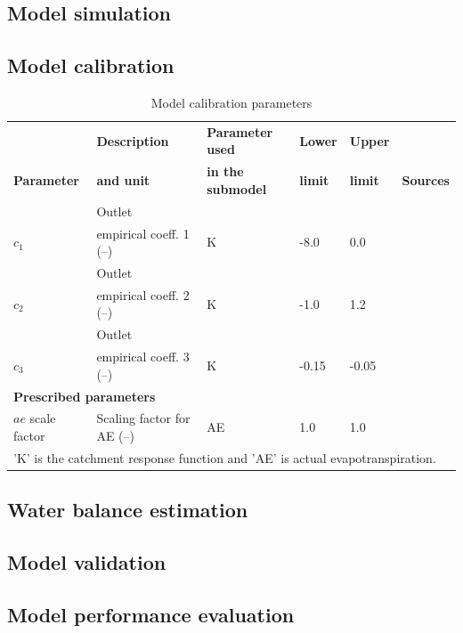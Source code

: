 \subsection{Model simulation}



\subsection{Model calibration}

\begin{table}[ht]
\centering
\caption{Model calibration parameters}
\label{tab:cali_parms}
\begin{tabular}{llllll}
&
  \textbf{Description} &
  \textbf{Parameter used} &
  \textbf{Lower} &
  \textbf{Upper} &
    \\ 
\textbf{Parameter} &
  \textbf{and unit} &
  \textbf{in the submodel} &
  \textbf{limit} &
  \textbf{limit} &
  \textbf{Sources} \\ \toprule
& Outlet & & & &  \\
$c_1$             & empirical coeff. 1 (–) & K  & -8.0  & 0.0   & \autocite{lombranaEvaluationsSnowSimulations2017,sapkotaRegionalModellingNarayani2016} \\
& Outlet & & & &  \\
$c_2$             & empirical coeff. 2 (–) & K  & -1.0  & 1.2   & \autocite{lombranaEvaluationsSnowSimulations2017,sapkotaRegionalModellingNarayani2016}  \\
& Outlet & & & &  \\
$c_3$             & empirical coeff. 3 (–) & K  & -0.15 & -0.05 & \autocite{lombranaEvaluationsSnowSimulations2017,sapkotaRegionalModellingNarayani2016}  \\
\multicolumn{6}{l}{\textbf{Prescribed parameters}}                             \\ \hline
$ae$ scale factor & Scaling factor for AE (–)          & AE & 1.0   & 1.0   & \autocite{lombranaEvaluationsSnowSimulations2017,sapkotaRegionalModellingNarayani2016} \\ 
\bottomrule

\multicolumn{6}{l}{'K' is the catchment response function and 'AE' is actual evapotranspiration.}   \\      
\end{tabular}
\end{table}

\subsection{Water balance estimation}

\subsection{Model validation}

\subsection{Model performance evaluation}